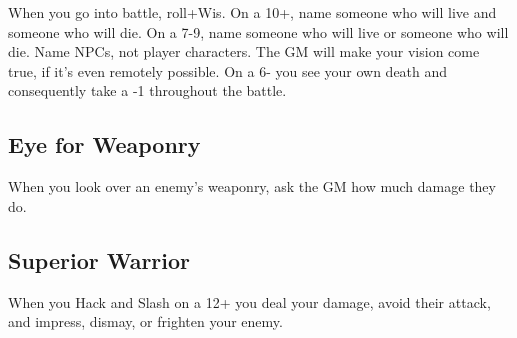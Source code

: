 When you go into battle, roll+Wis. On a 10+, name someone who will live and someone who will die. On a 7-9, name someone who will live or someone who will die. Name NPCs, not player characters. The GM will make your vision come true, if it's even remotely possible. On a 6- you see your own death and consequently take a -1 throughout the battle.

 
\subsection{Eye for Weaponry}    
 

When you look over an enemy's weaponry, ask the GM how much damage they do.

 
\subsection{Superior Warrior}    
 

When you Hack and Slash on a 12+ you deal your damage, avoid their attack, and impress, dismay, or frighten your enemy.









 
